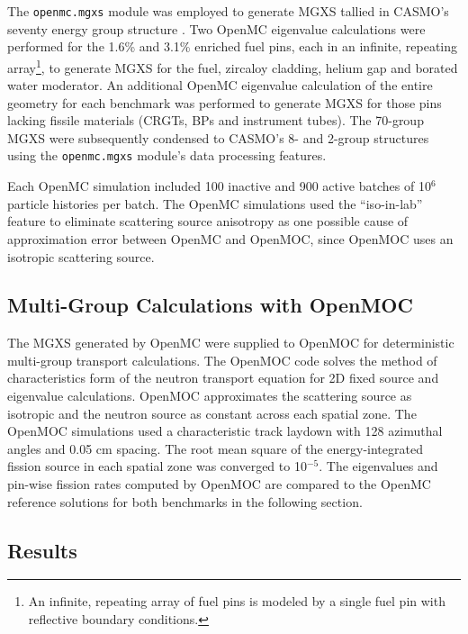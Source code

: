 The \texttt{openmc.mgxs} module was employed to generate MGXS tallied in CASMO's seventy energy group structure \cite{rhodes2006casmo}. Two OpenMC eigenvalue calculations were performed for the 1.6\% and 3.1\% enriched fuel pins, each in an infinite, repeating array\footnote{An infinite, repeating array of fuel pins is modeled by a single fuel pin with reflective boundary conditions.}, to generate MGXS for the fuel, zircaloy cladding, helium gap and borated water moderator. An additional OpenMC eigenvalue calculation of the entire geometry for each benchmark was performed to generate MGXS for those pins lacking fissile materials (CRGTs, BPs and instrument tubes). The 70-group MGXS were subsequently condensed to CASMO's 8- and 2-group structures using the \texttt{openmc.mgxs} module's data processing features.

Each OpenMC simulation included 100 inactive and 900 active batches of 10$^{6}$ particle histories per batch. The OpenMC simulations used the ``iso-in-lab'' feature to eliminate scattering source anisotropy as one possible cause of approximation error between OpenMC and OpenMOC, since OpenMOC uses an isotropic scattering source.


\subsection{Multi-Group Calculations with OpenMOC}
\label{subsec:openmoc}

The MGXS generated by OpenMC were supplied to OpenMOC \cite{boyd2014openmoc} for deterministic multi-group transport calculations. The OpenMOC code solves the method of characteristics form of the neutron transport equation for 2D fixed source and eigenvalue calculations. OpenMOC approximates the scattering source as isotropic and the neutron source as constant across each spatial zone. The OpenMOC simulations used a characteristic track laydown with 128 azimuthal angles and 0.05 cm spacing. The root mean square of the energy-integrated fission source in each spatial zone was converged to 10$^{-5}$. The eigenvalues and pin-wise fission rates computed by OpenMOC are compared to the OpenMC reference solutions for both benchmarks in the following section.


\subsection{Results}
\label{subsec:results}

